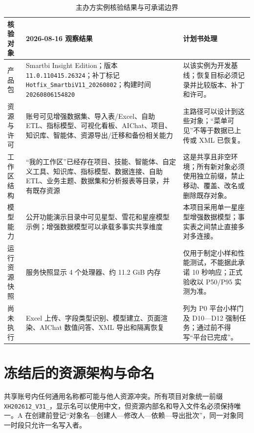 \documentclass[UTF8,fontset=windows,12pt,openany]{ctexbook}
\newcommand{\Field}[1]{{\small\nolinkurl{#1}}}
\begin{document}
\begin{longtable}{p{3.4cm}p{6.8cm}p{3.8cm}}
\caption{主办方实例核验结果与可承诺边界}\label{tab:smartbi-instance-audit}\\
\toprule
\textbf{核验对象} & \textbf{2026-08-16 观察结果} & \textbf{计划书处理}\\
\midrule
产品包 & Smartbi Insight Edition；版本 \Field{11.0.110415.26324}；补丁标记 \Field{Hotfix_SmartbiV11_20260802}；构建时间 \Field{20260806154820} & 以该实例为开发基线；恢复目标必须记录并比较版本、补丁和许可。\\
资源与许可 & 账号可见增强数据集、导入表/Excel、自助 ETL、指标模型、可视化看板、AIChat、项目、知识库、智能体、资源导出/迁移和备份相关能力 & 主路径可以设计到这些对象；“菜单可见”不等于数据已上传或 XML 已恢复。\\
工作区结构 & “我的工作区”已经存在项目、技能、智能体、自定义工具、知识库、指标模型、数据连接、自助 ETL、业务主题、数据集和分析报表等目录，并有既存资源 & 这是共享且非空环境；所有新对象必须使用独立前缀，禁止移动、覆盖、改名或删除既存对象。\\
模型能力 & 公开功能演示目录中可见星型、雪花和星座模型示例；增强数据模型可以承载多事实共享维度 & 本项目采用单一星座型增强数据模型；事实表之间禁止直接多对多连接。\\
运行资源快照 & 服务快照显示 4 个处理器、约 11.2 GiB 内存 & 仅用于制定小样和性能测试，不能据此承诺 10 秒响应；正式验收以 P50/P95 实测为准。\\
尚未执行 & Excel 上传、字段类型识别、模型建立、页面渲染、AIChat 数值问答、XML 导出和隔离恢复 & 列为 P0 平台小样门及 D10—D12 强制任务；通过前不得写“平台已完成”。\\
\bottomrule
\end{longtable}

\section{冻结后的资源架构与命名}

共享账号内任何通用名称都可能与他人资源冲突。所有项目对象统一前缀 \Field{XH202612_V31_}，显示名可以使用中文，但资源内部名和导入文件名必须保持唯一。A 在创建前登记“对象名—创建人—修改人—依赖—导出批次”，同一对象同一时段只允许一名写入者。
\end{document}
